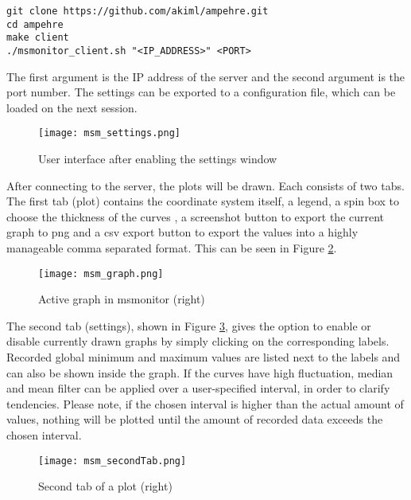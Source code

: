 \begin{lstlisting}[caption={install the client}, label=lst:msg4]
git clone https://github.com/akiml/ampehre.git
cd ampehre
make client
./msmonitor_client.sh "<IP_ADDRESS>" <PORT>
\end{lstlisting}
The first argument is the IP address of the server and the second argument is the port number.\newline
The settings can be exported to a configuration file, which can be loaded on the next session.
\begin{figure}[t!]
	\begin{center}
		\texttt{[image: msm\_settings.png]} 
		\caption{User interface after enabling the settings window}
		\label{fig:msm_settings}
	\end{center}
\end{figure}
After connecting to the server, the plots will be drawn.\newline 
Each consists of two tabs. The first tab (plot) contains the coordinate system itself, a legend, a spin box to choose the thickness of the curves , a screenshot button to export the current graph to png and a csv export button to export the values into a highly manageable comma separated format. This can be seen in Figure \ref{fig:msm_graph}.
\begin{figure}[t!]
	\begin{center}
		\texttt{[image: msm\_graph.png]} 
		\caption{Active graph in msmonitor (right)}
		\label{fig:msm_graph}
	\end{center}
\end{figure}
The second tab (settings), shown in Figure \ref{fig:msm_secondTab}, gives the option to enable or disable currently drawn graphs by simply clicking on the corresponding labels. Recorded global minimum and maximum values are listed next to the labels and can also be shown inside the graph.\newline
If the curves have high fluctuation, median and mean filter can be applied over a user-specified interval, in order to clarify tendencies. Please note, if the chosen interval is higher than the actual amount of values, nothing will be plotted until the amount of recorded data exceeds the chosen interval.
\begin{figure}[t!]
	\begin{center}
		\texttt{[image: msm\_secondTab.png]} 
		\caption{Second tab of a plot (right)}
		\label{fig:msm_secondTab}
	\end{center}
\end{figure}
